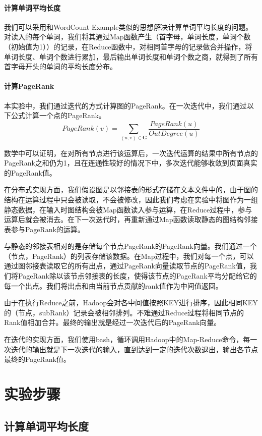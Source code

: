 \documentclass{article}
\begin{document}
\paragraph{计算单词平均长度}

我们可以采用和WordCount Example类似的思想解决计算单词平均长度的问题。对读入的每个单词，我们将其通过Map函数产生（首字母，单词长度，单词个数（初始值为1））的记录，在Reduce函数中，对相同首字母的记录做合并操作，将单词长度、单词个数进行累加，最后输出单词长度和单词个数之商，就得到了所有首字母开头的单词的平均长度分布。


\paragraph{计算PageRank}
本实验中，我们通过迭代的方式计算图的PageRank。在一次迭代中，我们通过以下公式计算一个点的PageRank。
$$ PageRank(v) = \sum_{(u,v)\in \mathbf{G}} {\frac{PageRank(u)}{OutDegree(u)}}$$

数学中可以证明，在对所有节点进行该运算后，一次迭代运算的结果中所有节点的PageRank之和仍为1，且在连通性较好的情况下中，多次迭代能够收敛到页面真实的PageRank值。

在分布式实现方面，我们假设图是以邻接表的形式存储在文本文件中的，由于图的结构在运算过程中只会被读取，不会被修改，因此我们考虑在实验中将图作为一组静态数据，在输入时图结构会被Map函数读入参与运算，在Reduce过程中，参与运算后就会被消去。在下一次迭代时，再重新通过Map函数读取静态的图结构邻接表参与PageRank的运算。

与静态的邻接表相对的是存储每个节点PageRank的PageRank向量。我们通过一个（节点，PageRank）的列表存储该数据。在Map过程中，我们对每一个点，可以通过图邻接表读取它的所有出点，通过PageRank向量读取节点的PageRank值，我们将PageRank除以该节点邻接表的长度，使得该节点的PageRank平均分配给它的每一个出点。我们将出点和由当前节点贡献的rank值作为中间值返回。

由于在执行Reduce之前，Hadoop会对各中间值按照KEY进行排序，因此相同KEY的（节点，subRank）记录会被相邻排列。不难通过Reduce过程将相同节点的Rank值相加合并。最终的输出就是经过一次迭代后的PageRank向量。

在迭代的实现方面，我们使用bash，循环调用Hadoop中的Map-Reduce命令，每一次迭代的输出就是下一次迭代的输入，直到达到一定的迭代次数退出，输出各节点最终的PageRank值。

\section{实验步骤}

\subsection{计算单词平均长度}
\end{document}
